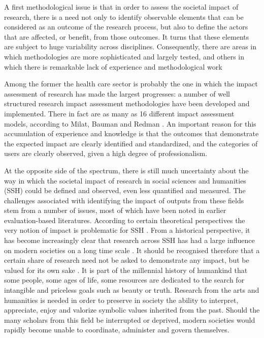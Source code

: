 \documentclass[]{book}
\begin{document}
A first methodological issue is that in order to assess the societal
impact of research, there is a need not only to identify observable
elements that can be considered as an outcome of the research process,
but also to define the actors that are affected, or benefit, from those
outcomes. It turns that these elements are subject to huge variability
across disciplines. Consequently, there are areas in which methodologies
are more sophisticated and largely tested, and others in which there is
remarkable lack of experience and methodological work
\citep[\citet{mitton2007knowledge},
\citet{cturcan2015national}]{stern2013long}

Among the former the health care sector is probably the one in which the
impact assessment of research has made the largest progresses: a number
of well structured research impact assessment methodologies have been
developed and implemented. There in fact are as many as 16 different
impact assessment models, according to Milat, Bauman and Redman
\citep{milat2015narrative}. An important reason for this accumulation of
experience and knowledge is that the outcomes that demonstrate the
expected impact are clearly identified and standardized, and the
categories of users are clearly observed, given a high degree of
professionalism.

At the opposite side of the spectrum, there is still much uncertainty
about the way in which the societal impact of research in social
sciences and humanities (SSH) could be defined and observed, even less
quantified and measured. The challenges associated with identifying the
impact of outputs from these fields stem from a number of issues, most
of which have been noted in earlier evaluation-based literatures.
According to certain theoretical perspectives the very notion of impact
is problematic for SSH \citep{blasi2018ssh}. From a historical
perspective, it has become increasingly clear that research across SSH
has had a large influence on modern societies on a long time scale
\citep{bod2013new}. It should be recognised therefore that a certain
share of research need not be asked to demonstrate any impact, but be
valued for its own sake \citep{small2013value}. It is part of the
millennial history of humankind that some people, some ages of life,
some resources are dedicated to the search for intangible and priceless
goals such as beauty or truth. Research from the arts and humanities is
needed in order to preserve in society the ability to interpret,
appreciate, enjoy and valorize symbolic values inherited from the past.
Should the many scholars from this field be interrupted or deprived,
modern societies would rapidly become unable to coordinate, administer
and govern themselves.
\end{document}
